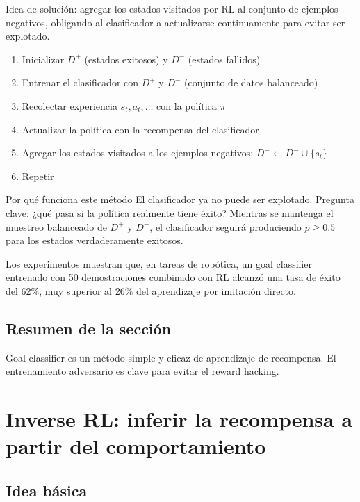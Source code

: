 \documentclass[a4paper]{article}
\begin{document}
Idea de solución: agregar los estados visitados por RL al conjunto de ejemplos negativos, obligando al clasificador a actualizarse continuamente para evitar ser explotado.

\begin{enumerate}
    \item Inicializar $D^+$ (estados exitosos) y $D^-$ (estados fallidos)
    \item Entrenar el clasificador con $D^+$ y $D^-$ (conjunto de datos balanceado)
    \item Recolectar experiencia $s_t, a_t, \ldots$ con la política $\pi$
    \item Actualizar la política con la recompensa del clasificador
    \item Agregar los estados visitados a los ejemplos negativos: $D^- \leftarrow D^- \cup \{s_t\}$
    \item Repetir
\end{enumerate}

\begin{knowledgebox}{Por qué funciona este método}
El clasificador ya no puede ser explotado. Pregunta clave: ¿qué pasa si la política realmente tiene éxito? Mientras se mantenga el muestreo balanceado de $D^+$ y $D^-$, el clasificador seguirá produciendo $p \geq 0.5$ para los estados verdaderamente exitosos.
\end{knowledgebox}

Los experimentos muestran que, en tareas de robótica, un goal classifier entrenado con 50 demostraciones combinado con RL alcanzó una tasa de éxito del 62\%, muy superior al 26\% del aprendizaje por imitación directo.

\subsection{Resumen de la sección}

Goal classifier es un método simple y eficaz de aprendizaje de recompensa. El entrenamiento adversario es clave para evitar el reward hacking.
\section{Inverse RL: inferir la recompensa a partir del comportamiento}

\subsection{Idea básica}
\end{document}
